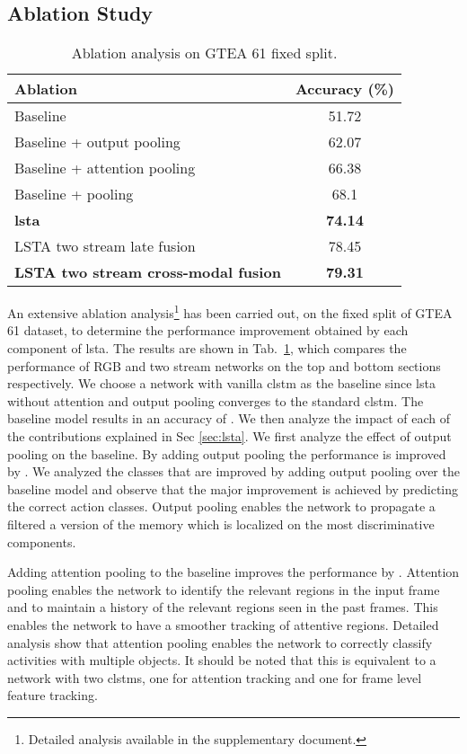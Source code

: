 \documentclass[10pt,twocolumn,letterpaper]{article}
\begin{document}
\begin{matrix*}[r]
	\subsection{Ablation Study}
	\begin{table}[t]\small
	\centering
	\begin{tabular}{|l|c|}
		\hline
		Ablation & Accuracy (\%) \\ \hline \hline
		Baseline & 51.72 \\ \hline
		Baseline + output pooling & 62.07\\ \hline
		Baseline + attention pooling & 66.38 \\ \hline
		Baseline + pooling & 68.1 \\ \hline
		\textbf{\ac{lsta}} & \textbf{74.14} \\ \hline \hline
		LSTA two stream late fusion  & 78.45 \\ \hline
		\textbf{LSTA two stream cross-modal fusion} & \textbf{79.31} \\ \hline
\end{tabular}
	\vspace{-0.2cm}
	\caption{Ablation analysis on GTEA 61 fixed split.}
	\label{tab:ablation}\vspace{-0.3cm}
\end{table}



An extensive ablation analysis\footnote{Detailed analysis available in the supplementary document.} has been carried out, on the fixed split of GTEA 61 dataset, to determine the performance improvement obtained by each component of \ac{lsta}.
The results are shown in Tab.~\ref{tab:ablation},
which compares the performance of RGB and two stream networks on the top and bottom sections respectively.
We choose a network with vanilla \ac{clstm} as the baseline since \ac{lsta} without attention and output pooling converges to the standard \ac{clstm}. The baseline model results in an accuracy of . We then analyze the impact of each of the contributions explained in Sec \ref{sec:lsta}. We first analyze the effect of output pooling on the baseline. By adding output pooling the performance is improved by . We analyzed the classes that are improved by adding output pooling over the baseline model and observe that the major improvement is achieved by predicting the correct action classes. Output pooling enables the network to propagate a filtered a version of the memory which is localized on the most discriminative components.

Adding attention pooling to the baseline improves the performance by . Attention pooling enables the network to identify the relevant  regions in the input frame and to maintain a history of the relevant regions seen in the past frames. This enables the network to have a smoother tracking of attentive regions. Detailed analysis show that attention pooling enables the network to correctly classify activities with multiple objects. It should be noted that this is equivalent to a network with two \ac{clstm}s, one for attention tracking and one for frame level feature tracking. 


\end{matrix*}
\end{document}
